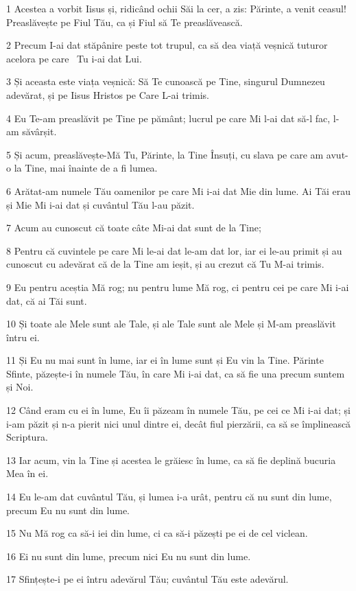 \par 1 Acestea a vorbit Iisus și, ridicând ochii Săi la cer, a zis: Părinte, a venit ceasul! Preaslăvește pe Fiul Tău, ca și Fiul să Te preaslăvească.
\par 2 Precum I-ai dat stăpânire peste tot trupul, ca să dea viață veșnică tuturor acelora pe care  Tu i-ai dat Lui.
\par 3 Și aceasta este viața veșnică: Să Te cunoască pe Tine, singurul Dumnezeu adevărat, și pe Iisus Hristos pe Care L-ai trimis.
\par 4 Eu Te-am preaslăvit pe Tine pe pământ; lucrul pe care Mi l-ai dat să-l fac, l-am săvârșit.
\par 5 Și acum, preaslăvește-Mă Tu, Părinte, la Tine Însuți, cu slava pe care am avut-o la Tine, mai înainte de a fi lumea.
\par 6 Arătat-am numele Tău oamenilor pe care Mi i-ai dat Mie din lume. Ai Tăi erau și Mie Mi i-ai dat și cuvântul Tău l-au păzit.
\par 7 Acum au cunoscut că toate câte Mi-ai dat sunt de la Tine;
\par 8 Pentru că cuvintele pe care Mi le-ai dat le-am dat lor, iar ei le-au primit și au cunoscut cu adevărat că de la Tine am ieșit, și au crezut că Tu M-ai trimis.
\par 9 Eu pentru aceștia Mă rog; nu pentru lume Mă rog, ci pentru cei pe care Mi i-ai dat, că ai Tăi sunt.
\par 10 Și toate ale Mele sunt ale Tale, și ale Tale sunt ale Mele și M-am preaslăvit întru ei.
\par 11 Și Eu nu mai sunt în lume, iar ei în lume sunt și Eu vin la Tine. Părinte Sfinte, păzește-i în numele Tău, în care Mi i-ai dat, ca să fie una precum suntem și Noi.
\par 12 Când eram cu ei în lume, Eu îi păzeam în numele Tău, pe cei ce Mi i-ai dat; și i-am păzit și n-a pierit nici unul dintre ei, decât fiul pierzării, ca să se împlinească Scriptura.
\par 13 Iar acum, vin la Tine și acestea le grăiesc în lume, ca să fie deplină bucuria Mea în ei.
\par 14 Eu le-am dat cuvântul Tău, și lumea i-a urât, pentru că nu sunt din lume, precum Eu nu sunt din lume.
\par 15 Nu Mă rog ca să-i iei din lume, ci ca să-i păzești pe ei de cel viclean.
\par 16 Ei nu sunt din lume, precum nici Eu nu sunt din lume.
\par 17 Sfințește-i pe ei întru adevărul Tău; cuvântul Tău este adevărul.
